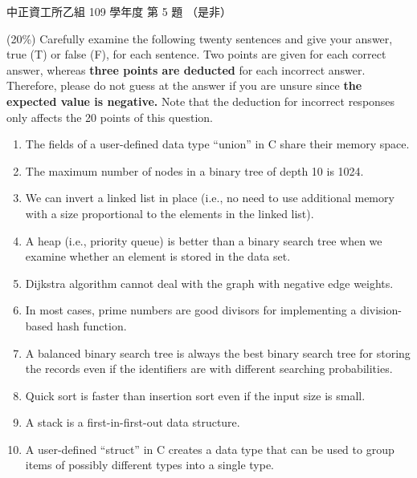 \begin{pastexam}[label={px:ccu-109-csb-02}]{中正資工所乙組 109 學年度 第 5 題}
（是非）

(20\%) Carefully examine the following twenty sentences and give your answer, true (T) or false
(F), for each sentence. Two points are given for each correct answer, whereas \textbf{three points
are deducted} for each incorrect answer. Therefore, please do not guess at the answer if you are
unsure since \textbf{the expected value is negative.} Note that the deduction for incorrect
responses only affects the 20 points of this question.
\begin{enumerate}[label=(\alph*)]
\item The fields of a user-defined data type ``union'' in C share their memory space.
\item The maximum number of nodes in a binary tree of depth 10 is 1024.
\item We can invert a linked list in place (i.e., no need to use additional memory with a size
proportional to the elements in the linked list).
\item A heap (i.e., priority queue) is better than a binary search tree when we examine whether
an element is stored in the data set.
\item Dijkstra algorithm cannot deal with the graph with negative edge weights.
\item In most cases, prime numbers are good divisors for implementing a division-based hash
function.
\item A balanced binary search tree is always the best binary search tree for storing the records
even if the identifiers are with different searching probabilities.
\item Quick sort is faster than insertion sort even if the input size is small.
\item A stack is a first-in-first-out data structure.
\item A user-defined ``struct'' in C creates a data type that can be used to group items of
possibly different types into a single type.
\end{enumerate}
\end{pastexam}

